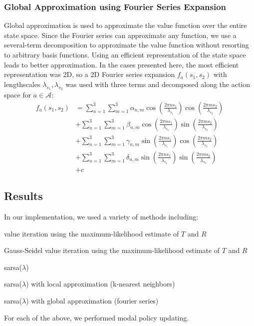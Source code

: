 \documentclass[10pt,letterpaper]{article}
\begin{document}
\begin{multicols*}{2}
	
	\subsubsection*{\sf \textbf{Global Approximation using Fourier Series Expansion}}
	
	Global approximation is used to approximate the value function over the entire state space. Since the Fourier series can approximate any function, we use a several-term decomposition to approximate the value function without resorting to arbitrary basis functions. Using an efficient representation of the state space leads to better approximation. In the cases presented here, the most efficient representation was 2D, so a 2D Fourier series expansion $f_a(s_1, s_2)$ with lengthscales $\lambda_{s_1}, \lambda_{s_2}$ was used with three terms and decomposed along the action space for $a \in \mathcal{A}$:
	\begin{align*}
	f_a(s_1, s_2) & = \sum_{n=1}^{3}\sum_{m=1}^{3}\alpha_{n,m}\cos\left(\frac{2\pi n s_1}{\lambda_{s_1}}\right)\cos\left(\frac{2\pi m s_2}{\lambda_{s_2}}\right) \\
	& + \sum_{n=1}^{3}\sum_{m=1}^{3}\beta_{n,m}\cos\left(\frac{2\pi n s_1}{\lambda_{s_1}}\right)\sin\left(\frac{2\pi m s_2}{\lambda_{s_2}}\right) \\
	& + \sum_{n=1}^{3}\sum_{m=1}^{3}\gamma_{n,m}\sin\left(\frac{2\pi n s_1}{\lambda_{s_1}}\right)\cos\left(\frac{2\pi m s_2}{\lambda_{s_2}}\right) \\
	& + \sum_{n=1}^{3}\sum_{m=1}^{3}\delta_{n,m}\sin\left(\frac{2\pi n s_1}{\lambda_{s_1}}\right)\sin\left(\frac{2\pi m s_2}{\lambda_{s_2}}\right) \\
	& + c
	\end{align*}
	
	\subsection*{\sf \textbf{Results}}
	
	In our implementation, we used a variety of methods including:
	\begin{compactenum}
		\item value iteration using the maximum-likelihood estimate of $T$ and $R$
		\item Gauss-Seidel value iteration using the maximum-likelihood estimate of $T$ and $R$
		\item sarsa($\lambda$)
		\item sarsa($\lambda$) with local approximation (k-nearest neighbors)
		\item sarsa($\lambda$) with global approximation (fourier series)
	\end{compactenum}
	For each of the above, we performed modal policy updating.
	

\end{multicols*}
\end{document}
